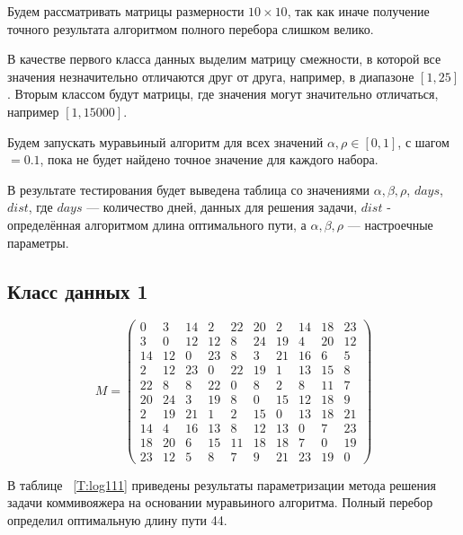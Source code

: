 \documentclass[12pt]{report}
\begin{document}
Будем рассматривать матрицы размерности $10\times10$, так как иначе получение точного результата алгоритмом полного перебора слишком велико.

В качестве первого класса данных выделим матрицу смежности, в которой все значения незначительно отличаются друг от друга, например, в диапазоне $[1, 25]$.
Вторым классом будут матрицы, где значения могут значительно отличаться, например $[1, 15000]$.

Будем запускать муравьиный алгоритм для всех значений $\alpha, \rho\in[0, 1]$, с шагом $= 0.1$, пока не будет найдено точное значение для каждого набора.

В результате тестирования будет выведена таблица со значениями $\alpha, \beta, \rho$, $days$, $ dist$, где $days$ — количество дней, данных для решения задачи, $dist$ - определённая алгоритмом длина оптимального пути, а $\alpha, \beta, \rho$ — настроечные параметры.

\subsection{Класс данных 1}
\begin{equation}
\label{matrix}
	M = \begin{pmatrix}
		0 &  3 & 14 &  2 & 22 & 20 &  2 & 14 & 18 & 23\\
		3 &  0 & 12 & 12 &  8 & 24 & 19 &  4 & 20 & 12\\
		14 & 12 & 0 & 23 &  8 &  3 & 21 & 16 &  6 &  5\\
		2 & 12 & 23 &  0 & 22 & 19 &  1 & 13 & 15  & 8\\
		22 &  8 &  8 & 22 &  0 &  8 &  2  & 8 & 11 &  7\\
		20 & 24 &  3 & 19 &  8  & 0 & 15 & 12 & 18  & 9\\
		2 & 19 & 21  & 1 &  2 & 15  & 0 & 13 & 18 & 21\\
		14 &  4 & 16 & 13 &  8 & 12 & 13 &  0 &  7 & 23\\
		18 & 20 &  6 & 15 & 11 & 18 & 18 &  7 &  0 & 19\\
		23 & 12 &  5  & 8 &  7 &  9 & 21 & 23 & 19 &  0
	\end{pmatrix}
\end{equation}

В таблице ~\ref{T:log111} приведены результаты параметризации метода решения задачи коммивояжера на основании муравьиного алгоритма. Полный перебор определил оптимальную длину пути 44.
\end{document}
